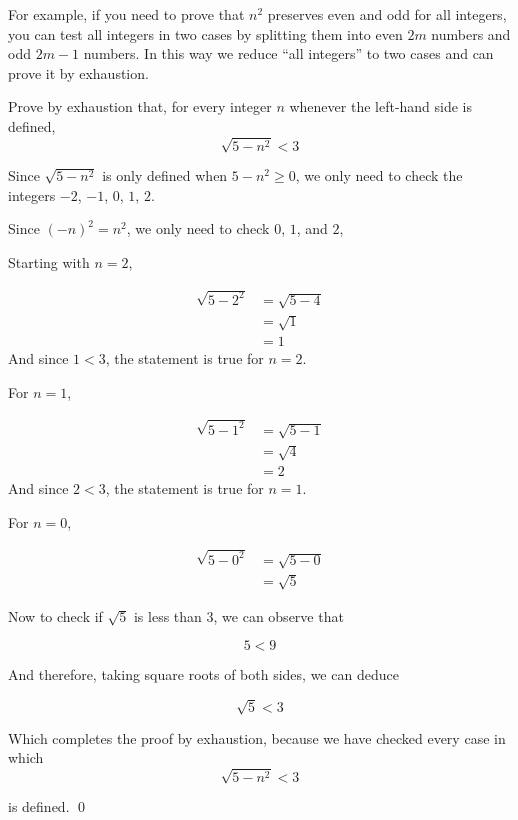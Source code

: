 For example, if you need to prove that $n^2$ preserves even and odd for all integers, 
you can test all integers in two cases by splitting them into even $2m$ numbers and odd $2m-1$ numbers. 
In this way we reduce ``all integers'' to two cases and can prove it by exhaustion.

\begin{example}

    Prove by exhaustion that, for every integer $n$ whenever the left-hand side is defined, 
    \[ \sqrt{5-n^2} < 3 \]

\end{example}

\begin{solution}
    Since $\sqrt{5-n^2} $ is only defined when $5-n^2\geq0$, we only need to check the integers 
    $-2$, $-1$, $0$, $1$, $2$. 

    Since $(-n)^2 = n^2$, we only need to check $0$, $1$, and $2$,

    Starting with $n=2$,

    \begin{align*}
    \sqrt{5-2^2} &= \sqrt{5-4} \\
     &= \sqrt{1} \\
     &= 1
    \end{align*}
    And since $1<3$, the statement is true for $n=2$.

    For $n=1$,

    \begin{align*}
    \sqrt{5-1^2} &= \sqrt{5-1} \\
     &= \sqrt{4} \\
     &= 2
    \end{align*}
    And since $2<3$, the statement is true for $n=1$.

    For $n=0$,

    \begin{align*}
    \sqrt{5-0^2} &= \sqrt{5-0} \\
     &= \sqrt{5} 
    \end{align*}

    Now to check if $\sqrt{5}$ is less than $3$, we can observe that 

    \[ 5<9\]

    And therefore, taking square roots of both sides, we can deduce

    \[ \sqrt{5} < 3\]

    Which completes the proof by exhaustion, because we have checked every case in which 
    \[ \sqrt{5-n^2} < 3 \]

    is defined.
    \qed
\end{solution}

